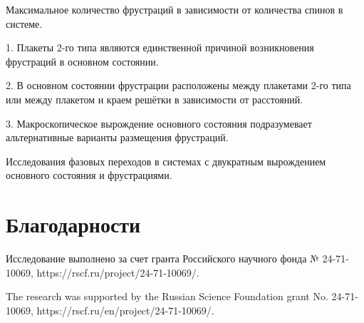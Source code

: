 \documentclass[utf8, babel, sor, jor, amsmath, amssymb, reprint]{elsarticle} %
\begin{document}
Максимальное количество фрустраций в зависимости от количества спинов в системе.

1. Плакеты 2-го типа являются единственной причиной возникновения фрустраций в основном состоянии.

2. В основном состоянии фрустрации расположены между плакетами 2-го типа или между плакетом и краем решётки в зависимости от расстояний.

3. Макроскопическое вырождение основного состояния подразумевает альтернативные варианты размещения фрустраций.


Исследования фазовых переходов в системах с двукратным вырождением основного состояния и фрустрациями.

\section{Благодарности}

Исследование выполнено за счет гранта Российского научного фонда № 24-71-10069, https://rscf.ru/project/24-71-10069/.

The research was supported by the Russian Science Foundation grant No. 24-71-10069, https://rscf.ru/en/project/24-71-10069/.


\end{document}
